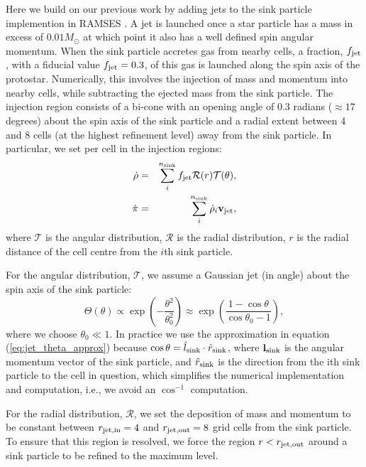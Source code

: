 \documentclass[../dissertation.tex]{subfiles}
\begin{document}
Here we build on our previous work \citep{2017MNRAS.465.1316M} by adding jets to the sink particle implemention in RAMSES \citep{2010MNRAS.409..985D,2014MNRAS.445.4015B}.   A jet is launched once a star particle has a mass in excess of $0.01 M_\odot$ at which point it also has a well defined spin angular momentum.
When the sink particle accretes gas from nearby cells, a fraction, $f_{\rm jet}$, with a fiducial value $f_{\rm jet} = 0.3$, of this gas is launched along the spin axis of the protostar.  %
Numerically, this involves the injection of mass and momentum into nearby cells, while subtracting the ejected mass from the sink particle.
The injection region consists of a bi-cone with an opening angle of $0.3$ radians ($\approx 17$ degrees) about the spin axis of the sink particle
and a radial extent between 4 and 8 cells (at the highest refinement level) away from the sink particle.
In particular, we set per cell in the injection regions:
\begin{eqnarray}
\dot{\rho} &=& \sum_i^{n_{\rm sink}} f_{\rm jet}\mathcal{R}(r)\mathcal{T}(\theta), \\
\dot{\bf \pi} &=& \sum_i^{n_{\rm sink}}\dot{\rho}_i {\bf v}_{\rm jet},
\end{eqnarray}
where $\mathcal{T}$ is the angular distribution, $\mathcal{R}$ is the radial distribution, $r$ is the radial distance of the cell centre from the $i$th sink particle.

For the angular distribution, $\mathcal{T}$, we assume a Gaussian jet (in angle) about the spin axis of the sink particle:
\begin{equation}
\Theta(\theta) \propto \exp\left(-\frac{\theta^2}{\theta_0^2}\right) \approx  \exp\left(\frac{1-\cos\theta}{\cos\theta_0 - 1}\right),
\label{eq:jet_theta_approx}
\end{equation}
where we choose $\theta_0 \ll 1$. %
In practice we use the approximation in equation (\ref{eq:jet_theta_approx}) because $\cos\theta = \hat{l}_{\rm sink} \cdot \hat{r}_{\rm sink} $, where ${\bf l}_{\rm sink}$ is the angular momentum vector of the sink particle, and $\hat{r}_{\rm sink}$ is the direction from the ith sink particle to the cell in question, which simplifies the numerical implementation and computation, i.e., we avoid an $\cos^{-1}$ computation.

For the radial distribution, $\mathcal{R}$, we set the deposition of mass and momentum to be constant between $r_{\rm jet, in} = 4$ and $r_{\rm jet, out} = 8$ grid cells from the sink particle.
To ensure that this region is resolved, we force the region $r<r_{\rm jet,out}$ around a sink particle to be  refined to the maximum level.
\end{document}
